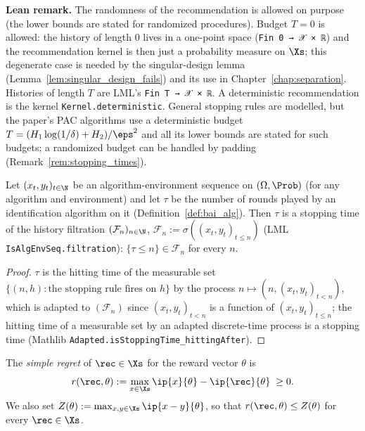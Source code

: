 \textbf{Lean remark.} The randomness of the recommendation is allowed on purpose (the lower
bounds are stated for randomized procedures). Budget $T = 0$ is allowed: the history of length
$0$ lives in a one-point space (\texttt{Fin 0 → 𝒳 × ℝ}) and the recommendation kernel is then
just a probability measure on $\Xs$; this degenerate case is needed by the singular-design lemma
(Lemma~\ref{lem:singular_design_fails}) and its use in Chapter~\ref{chap:separation}. Histories
of length $T$ are LML's \texttt{Fin T → 𝒳 × ℝ}. A deterministic recommendation is the kernel
\texttt{Kernel.deterministic}. General stopping rules are modelled, but the paper's PAC
algorithms use a deterministic budget $T = (H_1 \log(1/\delta) + H_2)/\eps^2$ and all its lower
bounds are stated for such budgets; a randomized budget can be handled by padding
(Remark~\ref{rem:stopping_times}).

\begin{lemma}\label{lem:stopping_time}
\leanok
{}
Let $(x_t, y_t)_{t\in\N}$ be an algorithm-environment sequence on $(\Omega,\Prob)$ (for any
algorithm and environment) and let $\tau$ be the number of rounds played by an identification
algorithm on it (Definition~\ref{def:bai_alg}). Then $\tau$ is a stopping time of the history
filtration $(\mathcal F_n)_{n\in\N}$, $\mathcal F_n := \sigma((x_t,y_t)_{t\le n})$ (LML
\texttt{IsAlgEnvSeq.filtration}): $\{\tau \le n\} \in \mathcal F_n$ for every $n$.
\end{lemma}
\begin{proof}
\leanok
$\tau$ is the hitting time of the measurable set $\{(n, h) : \text{the stopping rule fires on } h\}$
by the process $n \mapsto (n, (x_t,y_t)_{t<n})$, which is adapted to $(\mathcal F_n)$ since
$(x_t,y_t)_{t<n}$ is a function of $(x_t,y_t)_{t\le n}$; the hitting time of a measurable set by an
adapted discrete-time process is a stopping time (Mathlib
\texttt{Adapted.isStoppingTime\_hittingAfter}).
\end{proof}

\begin{definition}\label{def:regret}
\leanok
{}
The \emph{simple regret} of $\rec \in \Xs$ for the reward vector $\theta$ is
\[
  r(\rec, \theta) := \max_{x \in \Xs} \ip{x}{\theta} - \ip{\rec}{\theta} \;\ge 0 .
\]
We also set $Z(\theta) := \max_{x, y \in \Xs} \ip{x - y}{\theta}$, so that
$r(\rec,\theta) \le Z(\theta)$ for every $\rec \in \Xs$.
\end{definition}

